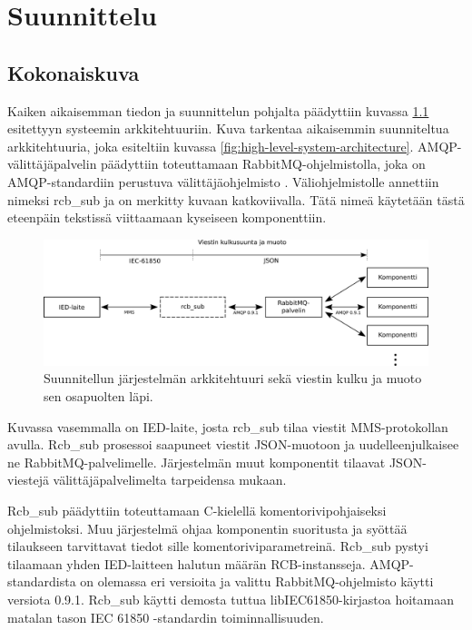 \chapter{Suunnittelu}
\label{ch:suunnittelu}


\section{Kokonaiskuva}
Kaiken aikaisemman tiedon ja suunnittelun pohjalta päädyttiin kuvassa \ref{fig:planned-system-architecture} esitettyyn systeemin arkkitehtuuriin. Kuva tarkentaa aikaisemmin suunniteltua arkkitehtuuria, joka esiteltiin kuvassa \ref{fig:high-level-system-architecture}. AMQP-välittäjäpalvelin päädyttiin toteuttamaan RabbitMQ-ohjelmistolla, joka on AMQP-stan\-dar\-diin perustuva välittäjäohjelmisto \cite{rabbitmq-homepage}. Väliohjelmistolle annettiin nimeksi rcb\_sub ja on merkitty kuvaan katkoviivalla. Tätä nimeä käytetään tästä eteenpäin tekstissä viittaamaan kyseiseen komponenttiin.

\begin{figure}[ht!]
	\includegraphics[width=1\textwidth]{pictures/planned-system-architecture.png}
	\caption{Suunnitellun järjestelmän arkkitehtuuri sekä viestin kulku ja muoto sen osapuolten läpi.}
	\label{fig:planned-system-architecture}
\end{figure}

Kuvassa vasemmalla on IED-laite, josta rcb\_sub tilaa viestit MMS-protokollan avulla. Rcb\_sub prosessoi saapuneet viestit JSON-muotoon ja uudelleenjulkaisee ne RabbitMQ-palvelimelle. Järjestelmän muut komponentit tilaavat JSON-viestejä välittäjäpalvelimelta tarpeidensa mukaan.

Rcb\_sub päädyttiin toteuttamaan C-kielellä komentorivipohjaiseksi ohjelmistoksi. Muu järjestelmä ohjaa komponentin suoritusta ja syöttää tilaukseen tarvittavat tiedot sille komentoriviparametreinä. Rcb\_sub pystyi tilaamaan yhden IED-laitteen halutun määrän RCB-instansseja. AMQP-stan\-dar\-dis\-ta on olemassa eri versioita ja valittu RabbitMQ-ohjelmisto käytti versiota 0.9.1. Rcb\_sub käytti demosta tuttua libIEC61850-kirjastoa hoitamaan matalan tason IEC 61850 -stan\-dar\-din toiminnallisuuden.

